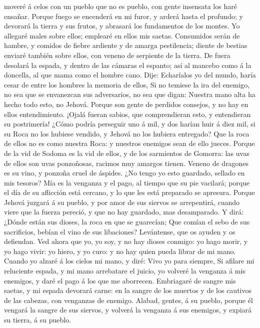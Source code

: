 moveré á celos con un pueblo que no es pueblo, con gente insensata los
haré ensañar.  Porque fuego se encenderá en mi furor, y
arderá hasta el profundo; y devorará la tierra y sus frutos, y abrasará
los fundamentos de los montes.  Yo allegaré males sobre
ellos; emplearé en ellos mis saetas.  Consumidos serán de
hambre, y comidos de fiebre ardiente y de amarga pestilencia; diente de
bestias enviaré también sobre ellos, con veneno de serpiente de la
tierra.  De fuera desolará la espada, y dentro de las
cámaras el espanto; así al mancebo como á la doncella, al que mama como
el hombre cano.  Dije: Echaríalos yo del mundo, haría cesar
de entre los hombres la memoria de ellos,  Si no temiese la
ira del enemigo, no sea que se envanezcan sus adversarios, no sea que
digan: Nuestra mano alta ha hecho todo esto, no Jehová. 
Porque son gente de perdidos consejos, y no hay en ellos entendimiento.
 ¡Ojalá fueran sabios, que comprendieran esto, y
entendieran su postrimería!  ¿Cómo podría perseguir uno á
mil, y dos harían huir á diez mil, si su Roca no los hubiese vendido, y
Jehová no los hubiera entregado?  Que la roca de ellos no
es como nuestra Roca: y nuestros enemigos sean de ello jueces.
 Porque de la vid de Sodoma es la vid de ellos, y de los
sarmientos de Gomorra: las uvas de ellos son uvas ponzoñosas, racimos
muy amargos tienen.  Veneno de dragones es su vino, y
ponzoña cruel de áspides.  ¿No tengo yo esto guardado,
sellado en mis tesoros?  Mía es la venganza y el pago, al
tiempo que su pie vacilará; porque el día de su aflicción está cercano,
y lo que les está preparado se apresura.  Porque Jehová
juzgará á su pueblo, y por amor de sus siervos se arrepentirá, cuando
viere que la fuerza pereció, y que no hay guardado, mas desamparado.
 Y dirá: ¿Dónde están sus dioses, la roca en que se
guarecían;  Que comían el sebo de sus sacrificios, bebían
el vino de sus libaciones? Levántense, que os ayuden y os defiendan.
 Ved ahora que yo, yo soy, y no hay dioses conmigo: yo hago
morir, y yo hago vivir: yo hiero, y yo curo: y no hay quien pueda librar
de mi mano.  Cuando yo alzaré á los cielos mi mano, y diré:
Vivo yo para siempre,  Si afilare mi reluciente espada, y
mi mano arrebatare el juicio, yo volveré la venganza á mis enemigos, y
daré el pago á los que me aborrecen.  Embriagaré de sangre
mis saetas, y mi espada devorará carne: en la sangre de los muertos y de
los cautivos de las cabezas, con venganzas de enemigo. 
Alabad, gentes, á su pueblo, porque él vengará la sangre de sus siervos,
y volverá la venganza á sus enemigos, y expiará su tierra, á su pueblo.

